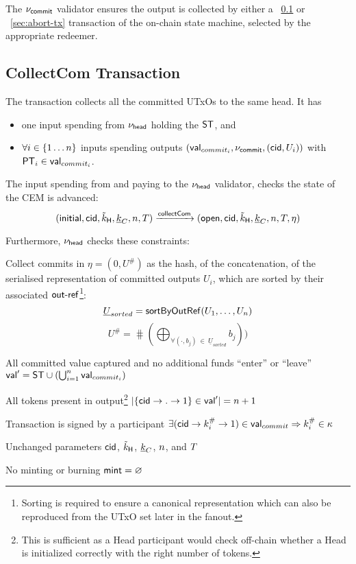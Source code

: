\noindent The $\nu_\mathsf{commit}$ validator ensures the output is collected by either a \mtxCCom{}~\ref{sec:collect-tx} or \mtxAbort{}~\ref{sec:abort-tx} transaction of the on-chain state machine, selected by the appropriate redeemer.

\subsection{CollectCom Transaction}\label{sec:collect-tx}



\noindent The \mtxCCom{} transaction collects all the committed UTxOs to the same head. It has
\begin{itemize}
  \item one input spending from $\nu_\mathsf{head}$ holding the $\mathsf{ST}$, and
  \item $\forall i \in \{1 \dots n\}$ inputs spending \mtxCom{} outputs $(\mathsf{val}_{commit_i}, \nu_\mathsf{commit}, (\mathsf{cid}, U_{i}))$ with $\mathsf{PT}_{i} \in \mathsf{val}_{commit_{i}}$.
\end{itemize}
The input spending from and paying to the $\nu_\mathsf{head}$ validator, checks the state
of the CEM is advanced:
\[
   (\mathsf{initial},\mathsf{cid},\tilde{k}_{\mathsf{H}},\underline{k}_C,n,T) \xrightarrow{\mathsf{collectCom}} (\mathsf{open},\mathsf{cid},\tilde{k}_{\mathsf{H}},\underline{k}_C,n,T,\eta)
\]

\noindent Furthermore, $\nu_\mathsf{head}$ checks these constraints:
\begin{menumerate}
  \item Collect commits in $\eta = (0, U^{\#})$ as the hash, of the concatenation, of
  the serialised representation of committed outputs $U_{i}$, which are sorted by their associated $\mathsf{out\textsf{-}{}ref}$\footnote{Sorting is required to ensure a canonical representation which can also be reproduced from the UTxO set later in the fanout.}:  
  \[
    \underline{U}_{sorted} = \mathsf{sortByOutRef} ( U_{1}, \dots, U_{n} )
  \]
  \[
    U^{\#} = \hash(\bigoplus_{\forall (\cdot, b_{j})~\in~\underline{U}_{sorted}} b_{j}))
  \]
  \item All committed value captured and no additional funds ``enter'' or ``leave''\\
  $\mathsf{val}' = \mathsf{ST} \cup (\bigcup_{i=1}^{n} \mathsf{val}_{commit_i})$
  \item All tokens present in output\footnote{This is sufficient as a Head participant would check off-chain whether a Head is initialized correctly with the right number of tokens.}
  $|\{\mathsf{cid} \rightarrow . \rightarrow 1\} \in \mathsf{val}'| = n + 1$
  \item Transaction is signed by a participant $\exists (\mathsf{cid} \rightarrow k^{\#}_{i} \rightarrow 1) \in \mathsf{val}_{commit} \Rightarrow k^{\#}_{i} \in \kappa$
  \item Unchanged parameters $\mathsf{cid}$, $\tilde{k}_{\mathsf{H}}$, $\underline{k}_C$, $n$, and
  $T$ 
  \item No minting or burning  $\mathsf{mint} = \varnothing$
\end{menumerate}

